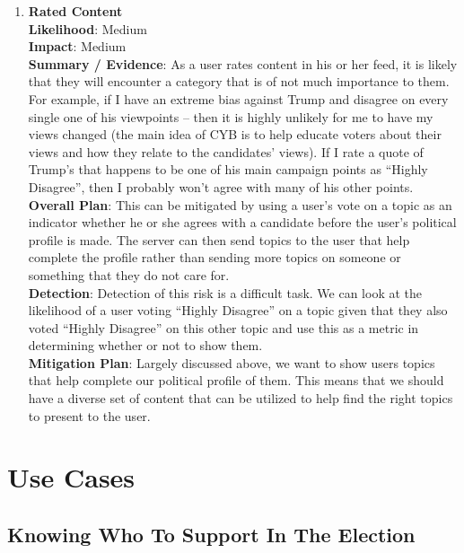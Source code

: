 \documentclass[11pt]{article}
\begin{document}
\begin{enumerate}[nolistsep]
    \item \textbf{Rated Content}\\
        \textbf{Likelihood}: Medium\\
        \textbf{Impact}: Medium\\
        \textbf{Summary / Evidence}: As a user rates content in his or her feed, it is likely that they will encounter a category that is of not much importance to them. For example, if I have an extreme bias against Trump and disagree on every single one of his viewpoints -- then it is highly unlikely for me to have my views changed (the main idea of CYB is to help educate voters about their views and how they relate to the candidates' views). If I rate a quote of Trump's that happens to be one of his main campaign points as ``Highly Disagree'', then I probably won't agree with many of his other points.\\
        \textbf{Overall Plan}: This can be mitigated by using a user's vote on a topic as an indicator whether he or she agrees with a candidate before the user's political profile is made. The server can then send topics to the user that help complete the profile rather than sending more topics on someone or something that they do not care for.\\
        \textbf{Detection}: Detection of this risk is a difficult task. We can look at the likelihood of a user voting ``Highly Disagree'' on a topic given that they also voted ``Highly Disagree'' on this other topic and use this as a metric in determining whether or not to show them.\\
        \textbf{Mitigation Plan}: Largely discussed above, we want to show users topics that help complete our political profile of them. This means that we should have a diverse set of content that can be utilized to help find the right topics to present to the user.
\end{enumerate}

\newpage
\section{Use Cases}
\vspace{-10pt}
\subsection{Knowing Who To Support In The Election}
\end{document}
